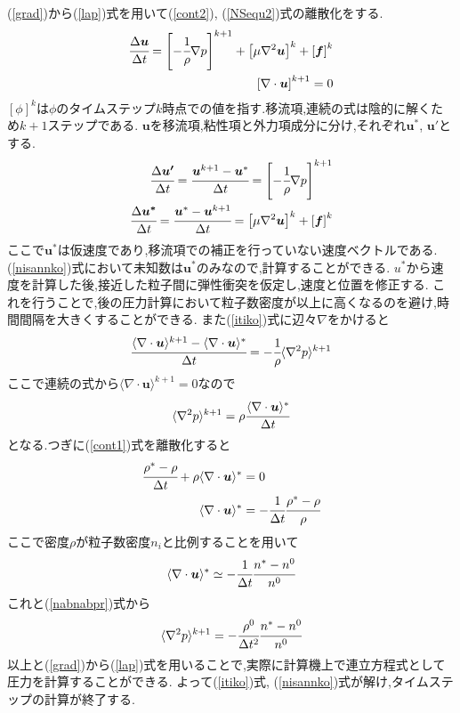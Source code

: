 \documentclass[uplatex,a4j,11pt]{jsarticle}
\begin{document}
(\ref{grad})から(\ref{lap})式を用いて(\ref{cont2}), (\ref{NSequ2})式の離散化をする.
\begin{align}
    \cfrac{\Delta \bm{u}}{\Delta t}=\left[-\cfrac{1}{\rho}\nabla p\right]^{k+1}+\left[\mu\nabla^2\bm{u}\right]^k+\left[\bm{f}\right]^k\\
    \left[\nabla\cdot\bm{u}\right]^{k+1}=0
\end{align}
$[\phi]^k$は$\phi$のタイムステップ$k$時点での値を指す.移流項,連続の式は陰的に解くため$k+1$ステップである.
$\bm{u}$を移流項,粘性項と外力項成分に分け,それぞれ$\bm{u}^*$, $\bm{u}'$とする.
\begin{align}
    \label{itiko}
    \cfrac{\Delta \bm{u'}}{\Delta t}=\cfrac{\bm{u}^{k+1}-\bm{u}^*}{\Delta t}=\left[-\cfrac{1}{\rho}\nabla p\right]^{k+1}\\
    \label{nisannko}
    \cfrac{\Delta \bm{u^*}}{\Delta t}=\cfrac{\bm{u}^*-\bm{u}^{k+1}}{\Delta t}=\left[\mu\nabla^2\bm{u}\right]^k+\left[\bm{f}\right]^k
\end{align}
ここで$\bm{u}^*$は仮速度であり,移流項での補正を行っていない速度ベクトルである.
(\ref{nisannko})式において未知数は$\bm{u}^*$のみなので,計算することができる.
$u^*$から速度を計算した後,接近した粒子間に弾性衝突を仮定し,速度と位置を修正する.
これを行うことで,後の圧力計算において粒子数密度が以上に高くなるのを避け,時間間隔を大きくすることができる.
また(\ref{itiko})式に辺々$\nabla$をかけると
\begin{align}
    \cfrac{\langle\nabla\cdot\bm{u}\rangle^{k+1}-\langle\nabla\cdot\bm{u}\rangle^{*}}{\Delta t}=-\cfrac{1}{\rho}\langle\nabla^2p\rangle^{k+1}
\end{align}
ここで連続の式から$\langle\nabla\cdot\bm{u}\rangle^{k+1}=0$なので
\begin{align}
    \label{nabnabpr}
    \langle\nabla^2p\rangle^{k+1}=\rho\cfrac{\langle\nabla\cdot\bm{u}\rangle^{*}}{\Delta t}
\end{align}
となる.つぎに(\ref{cont1})式を離散化すると
\begin{align}
    \cfrac{\rho^*-\rho}{\Delta t}+\rho\langle\nabla\cdot\bm{u}\rangle^*&=0\\
    \langle\nabla\cdot\bm{u}\rangle^*&=-\cfrac{1}{\Delta t}\cfrac{\rho^*-\rho}{\rho}
\end{align}
ここで密度$\rho$が粒子数密度$n_i$と比例することを用いて
\begin{align}
    \langle\nabla\cdot\bm{u}\rangle^*\simeq-\cfrac{1}{\Delta t}\cfrac{n^*-n^0}{n^0}
\end{align}
これと(\ref{nabnabpr})式から
\begin{align}
    \label{nabnabpn}
    \langle\nabla^2p\rangle^{k+1}=-\cfrac{\rho^0}{\Delta t^2}\cfrac{n^*-n^0}{n^0}
\end{align}
以上と(\ref{grad})から(\ref{lap})式を用いることで,実際に計算機上で連立方程式として圧力を計算することができる.
よって(\ref{itiko})式, (\ref{nisannko})式が解け,タイムステップの計算が終了する.\cite{ryuusinyuumon}
\end{document}
